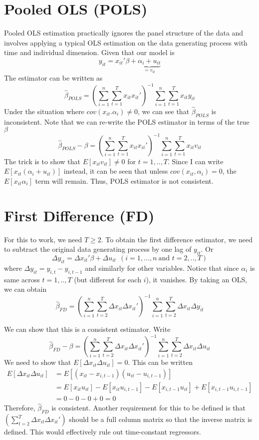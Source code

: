 \section{Pooled OLS (POLS)}
Pooled OLS estimation practically ignores the panel structure of the data and involves applying a typical OLS estimation on the data generating process with time and individual dimension. Given that our model is
\small{\[
y_{it}= x_{it}'\beta+\underbrace{\alpha_i+u_{it}}_{=v_{it}}
\]}\normalsize
The estimator can be written as
\small{\[
\hat{\beta}_{POLS}=\left(\sum_{i=1}^n\sum_{t=1}^T x_{it}x_{it}'\right)^{-1}\sum_{i=1}^n\sum_{t=1}^T x_{it}y_{it}
\]}\normalsize
Under the situation where $cov(x_{it}.\alpha_i)\neq 0$, we can see that $\hat{\beta}_{POLS}$ is inconsistent. Note that we can re-write the POLS estimator in terms of the true $\beta$ 
\footnotesize{\[
\hat{\beta}_{POLS}-\beta = \left(\sum_{i=1}^n\sum_{t=1}^T x_{it}x_{it}'\right)^{-1}\sum_{i=1}^n\sum_{t=1}^T x_{it}v_{it}
\]}\normalsize
The trick is to show that $E[x_{it}v_{it}]\neq0$ for $t=1,..,T$. Since I can write $E[x_{it}(\alpha_i+u_{it})]$ instead, it can be seen that unless $cov(x_{it},\alpha_i)=0$, the $E[x_{it}\alpha_i]$ term will remain. Thus, POLS estimator is not consistent. \par
\section{First Difference (FD)}
For this to work, we need $T\geq 2$. To obtain the first difference estimator, we need to subtract the original data generating process by one lag of $y_{it}$. Or
\[
\Delta y_{it}= \Delta x_{it}'\beta+\Delta u_{it}\ \ (i=1,...,n \ \text{and }t=2,..,T)
\]
where $\Delta y_{it} = y_{i,t}-y_{i,t-1}$ and similarly for other variables. Notice that since $\alpha_i$ is same across $t=1,..,T$ (but different for each $i$), it vanishes. By taking an OLS, we can obtain
\[
\hat{\beta}_{FD}=\left(\sum_{i=1}^n\sum_{t=2}^T \Delta x_{it}\Delta x_{it}'\right)^{-1}\sum_{i=1}^n\sum_{t=2}^T \Delta x_{it}\Delta y_{it}
\]
\par
We can show that this is a consistent estimator. Write
\[
\hat{\beta}_{FD}-\beta =\left(\sum_{i=1}^n\sum_{t=2}^T \Delta x_{it}\Delta x_{it}'\right)^{-1}\sum_{i=1}^n\sum_{t=2}^T \Delta x_{it}\Delta u_{it}
\]
We need to show that $E[\Delta x_{it} \Delta u_{it}]=0$. This can be written
\[
\begin{aligned}
E[\Delta x_{it} \Delta u_{it}]&=E[ (x_{it}-x_{i,t-1})( u_{it}-u_{i,t-1})]\\
&=E[ x_{it}u_{it}]-E[x_{it}u_{i,t-1}]-E[x_{i,t-1}u_{it}]+E[x_{i,t-1}u_{i,t-1}]\\
&= 0-0-0+0=0
\end{aligned}
\] 
Therefore, $\hat{\beta}_{FD}$ is consistent. Another requirement for this to be defined is that $\left(\sum_{t=2}^T \Delta x_{it}\Delta x_{it}'\right)$ should be a full column matrix so that the inverse matrix is defined. This would effectively rule out time-constant regressors. 
